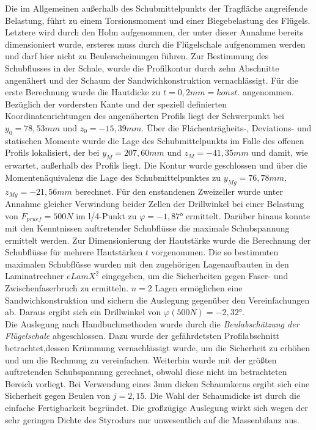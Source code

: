 \noindent Die im Allgemeinen außerhalb des Schubmittelpunkts der Tragfläche angreifende Belastung, führt zu einem Torsionsmoment und einer Biegebelastung des Flügels. Letztere wird durch den Holm aufgenommen, der unter dieser Annahme bereits dimensioniert wurde, ersteres muss durch die Flügelschale aufgenommen werden und darf hier nicht zu Beulerscheinungen führen. Zur Bestimmung des Schubflusses in der Schale, wurde die Profilkontur durch zehn Abschnitte angenähert und der Schaum der Sandwichkonstruktion vernachlässigt. Für die erste Berechnung wurde die Hautdicke zu $ t=0,2mm=konst. $ angenommen. Bezüglich der vordersten Kante und der speziell definierten Koordinatenrichtungen des angenäherten Profils liegt der Schwerpunkt bei $ y_{0}=78,53mm $ und $ z_{0}=-15,39mm $. Über die Flächenträgheits-, Deviations- und statischen Momente wurde die Lage des Schubmittelpunkts im Falle des offenen Profils lokalisiert, der bei $ y_{M}=207,60mm $ und $ z_{M}=-41,35mm $ und damit, wie erwartet, außerhalb des Profils liegt. Die Kontur wurde geschlossen und über die Momentenäquivalenz die Lage des Schubmittelpunktes zu $ y_{Mg}=76,78mm $, $ z_{Mg}=-21,56mm $ berechnet. Für den enstandenen Zweizeller wurde unter Annahme gleicher Verwindung beider Zellen der Drillwinkel bei einer Belastung von $ F_{pruef}=500N $ im l/4-Punkt zu $ \varphi=-1,87° $ ermittelt. Darüber hinaus konnte mit den Kenntnissen auftretender Schubflüsse die maximale Schubspannung ermittelt werden. Zur Dimensionierung der Hautstärke wurde die Berechnung der Schubflüsse für mehrere Hautstärken $ t $ vorgenommen. Die so bestimmten maximalen Schubflüsse wurden mit den zugehörigen Lagenaufbauten in den Laminatrechner $ eLamX^{2} $ eingegeben, um die Sicherheiten gegen Faser- und Zwischenfaserbruch zu ermitteln. $ n=2 $ Lagen ermöglichen eine Sandwichkonstruktion und sichern die Auslegung gegenüber den Vereinfachungen ab. Daraus ergibt sich ein Drillwinkel von $ \varphi(500N)=-2,32° $.\\

\noindent Die Auslegung nach Handbuchmethoden wurde durch die \textit{Beulabschätzung der Flügelschale} abgeschlossen. Dazu wurde der gefährdetsten Profilabschnitt betrachtet,dessen Krümmung vernachlässigt wurde, um die Sicherheit zu erhöhen und um die Rechnung zu vereinfachen. Weiterhin wurde mit der größten auftretenden Schubspannung gerechnet, obwohl diese nicht im betrachteten Bereich vorliegt. Bei Verwendung eines 3mm dicken Schaumkerns ergibt sich eine Sicherheit gegen Beulen von $ j=2,15 $. Die Wahl der Schaumdicke ist durch die einfache Fertigbarkeit begründet. Die großzügige Auslegung wirkt sich wegen der sehr geringen Dichte des Styrodurs nur unwesentlich auf die Massenbilanz aus. 



